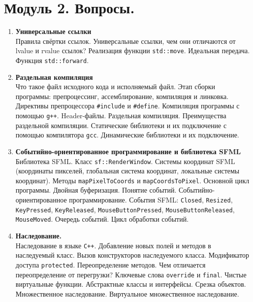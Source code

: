 \documentclass{article}
\begin{document}

\section*{Модуль 2. Вопросы.}


\begin{enumerate}

\item \textbf{Универсальные ссылки}\\
Правила свёртки ссылок. Универсальные ссылки, чем они отличаются от lvalue и rvalue ссылок? Реализация функции \texttt{std::move}. Идеальная передача. Функция \texttt{std::forward}.


\item \textbf{Раздельная компиляция}\\
Что такое файл исходного кода и исполняемый файл. Этап сборки программы: препроцессинг, ассемблирование, компиляция и линковка. Директивы препроцессора \texttt{\#include} и \texttt{\#define}. Компиляция программы с помощью \texttt{g++}. Header-файлы. Раздельная компиляция. Преимущества раздельной компиляции. Статические библиотеки и их подключение с помощью компилятора \texttt{gcc}. Динамические библиотеки и их подключение.

\item \textbf{Событийно-ориентированное программирование и библиотека SFML}\\
Библиотека SFML. Класс \texttt{sf::RenderWindow}. Системы координат SFML (координаты пикселей, глобальная система координат, локальные системы координат). Методы \texttt{mapPixelToCoords} и \texttt{mapCoordsToPixel}. Основной цикл программы. Двойная буферизация. Понятие событий. Событийно-ориентированное программирование. События SFML: \texttt{Closed}, \texttt{Resized}, \texttt{KeyPressed}, \texttt{KeyReleased}, \texttt{MouseButtonPressed},  \texttt{MouseButtonReleased}, \texttt{MouseMoved}. Очередь событий. Цикл обработки событий.


\item \textbf{Наследование.}\\
Наследование в языке \texttt{C++}. Добавление новых полей и методов в наследуемый класс. Вызов конструкторов наследуемого класса. Модификатор доступа \texttt{protected}. Переопределение методов. Чем отличается переопределение от перегрузки? Ключевые слова \texttt{override} и \texttt{final}. Чистые виртуальные функции. Абстрактные классы и интерфейсы.  Срезка объектов. Множественное наследование. Виртуальное множественное наследование.


\end{enumerate}
\end{document}
